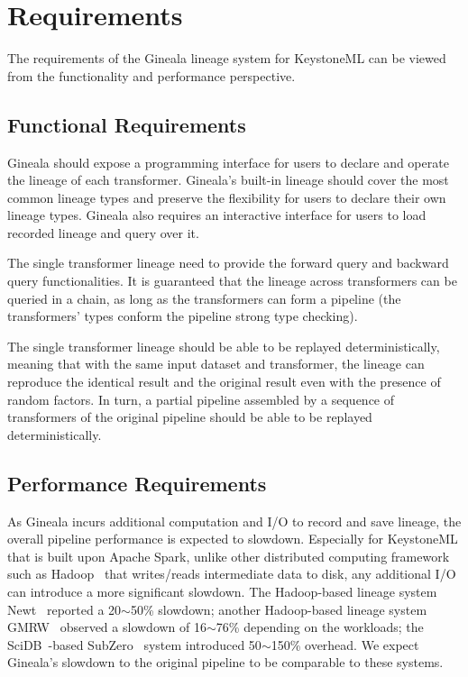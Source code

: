 \documentclass{sig-alternate}
\begin{document}
\section{Requirements}
\label{sec:Req}
The requirements of the Gineala lineage system for KeystoneML can be viewed from the functionality and performance perspective.

\subsection{Functional Requirements}
Gineala should expose a programming interface for users to declare and operate the lineage of each transformer. 
Gineala's built-in lineage should cover the most common lineage types and preserve the flexibility for users to declare their own lineage types.
Gineala also requires an interactive interface for users to load recorded lineage and query over it.

The single transformer lineage need to provide the forward query and backward query functionalities. 
It is  guaranteed that the lineage across transformers can be queried in a chain, as long as the transformers
can form a pipeline (the transformers' types conform the pipeline strong type checking).

The single transformer lineage should be able to be replayed deterministically, meaning that with the same input dataset and transformer,
the lineage can reproduce the identical result and the original result even with the presence of random factors.
In turn, a partial pipeline assembled by a sequence of transformers of the original pipeline should be able to be replayed deterministically.

\subsection{Performance Requirements}
\label{sec:Req-Perf}
As Gineala incurs additional computation and I/O to record and save lineage, the overall pipeline performance is expected to slowdown.
Especially for KeystoneML that is built upon Apache Spark, unlike other distributed computing framework such as Hadoop~\cite{HADOOP} 
that writes/reads intermediate data to disk, any additional I/O can introduce a more significant slowdown. 
The Hadoop-based lineage system Newt~\cite{logothetis13} reported a 20$\sim$50\% slowdown; 
another Hadoop-based lineage system GMRW~\cite{ikeda11} observed a slowdown of 16$\sim$76\% depending on the workloads;
the SciDB~\cite{brown10}-based SubZero~\cite{wu13} system introduced 50$\sim$150\% overhead. 
We expect Gineala's slowdown to the original pipeline to be comparable to these systems.
\end{document}
